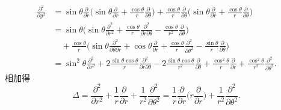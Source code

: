 \begin{itemize}
\begin{align*}
    \frac{\partial^2}{\partial y^2}
    &=\sin\theta\frac{\partial}{\partial r}\bigg(\!\sin\theta\frac{\partial}{\partial r}
    +\frac{\cos\theta}{r}\frac{\partial}{\partial\theta}\bigg)
    +\frac{\cos\theta}{r}\frac{\partial}{\partial\theta}\bigg(\!\sin\theta\frac{\partial}{\partial r}
    +\frac{\cos\theta}{r}\frac{\partial}{\partial\theta}\bigg)\\
    &=\sin\theta\bigg(\!\sin\theta\frac{\partial^2}{\partial r^2}
    +\frac{\cos\theta}{r}\frac{\partial^2}{\partial r\partial\theta}
    -\frac{\cos\theta}{r^2}\frac{\partial}{\partial\theta}\bigg)\\
    &\quad+\frac{\cos\theta}{r}\bigg(\!\sin\theta\frac{\partial^2}{\partial\theta\partial r}
    +\cos\theta\frac{\partial}{\partial r}
    +\frac{\cos\theta}{r}\frac{\partial^2}{\partial\theta^2}
    -\frac{\sin\theta}{r}\frac{\partial}{\partial\theta}\bigg)\\
    &=\sin^2\theta\frac{\partial^2}{\partial r^2}
    +2\frac{\sin\theta\cos\theta}{r}\frac{\partial^2}{\partial r\partial\theta}
    -2\frac{\sin\theta\cos\theta}{r^2}\frac{\partial}{\partial\theta}
    +\frac{\cos^2\theta}{r}\frac{\partial}{\partial r}
    +\frac{\cos^2\theta}{r^2}\frac{\partial^2}{\partial\theta^2}.
    \end{align*}
    相加得
    $$\Delta=\frac{\partial^2}{\partial r^2}
    +\frac{1}{r}\frac{\partial}{\partial r}
    +\frac{1}{r^2}\frac{\partial^2}{\partial\theta^2}
    =\frac{1}{r}\frac{\partial}{\partial r}\bigg(r\frac{\partial}{\partial r}\bigg)
    +\frac{1}{r^2}\frac{\partial^2}{\partial\theta^2}.$$


\end{itemize}
